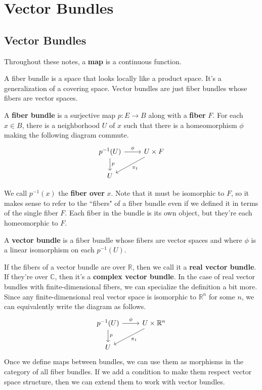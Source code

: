 \documentclass[twoside,10pt]{report}
\begin{document}
\tableofcontents



\chapter{Vector Bundles}


\section{Vector Bundles}

\begin{note}[]
Throughout these notes, a \textbf{map} is a continuous function.
\end{note}

A fiber bundle is a space that looks locally like a product space. It's a generalization of a covering space. Vector bundles are just fiber bundles whose fibers are vector spaces.

\begin{defn}[]
	A \textbf{fiber bundle} is a surjective map $p:E\to B$ along with a \textbf{fiber} $F$. For each $x \in B$, there is a neighborhood $U$ of $x$ such that there is a homeomorphism $\phi$ making the following diagram commute.
\[
\begin{tikzcd}
	p^{-1}(U) \rar{\phi}\dar{p} & U\times F\arrow[dl,"\pi_1"]\\
	U
\end{tikzcd}
\]
\end{defn}
We call $p^{-1}(x)$ the \textbf{fiber over} $x$. {\color{red}Note that it must be isomorphic to $F$}, so it makes sense to refer to the ``fibers" of a fiber bundle even if we defined it in terms of the single fiber $F$. Each fiber in the bundle is its own object, but they're each homeomorphic to $F$.

\begin{defn}
A \textbf{vector bundle} is a fiber bundle whose fibers are vector spaces and where $\phi$ is a linear isomorphism on each $p^{-1}(U)$.
\end{defn}

If the fibers of a vector bundle are over $\mathbb{R}$, then we call it a \textbf{real vector bundle}. If they're over $\mathbb{C}$, then it's a \textbf{complex vector bundle}. In the case of real vector bundles with finite-dimensional fibers, we can specialize the definition a bit more. Since any finite-dimensional real vector space is isomorphic to $\mathbb{R}^{n}$ for some $n$, we can equivalently write the diagram as follows.
\[
\begin{tikzcd}
        p^{-1}(U) \rar{\phi}\dar{p} & U\times \mathbb{R}^{n}\arrow[dl,"\pi_1"]\\
        U
\end{tikzcd}
\]
Once we define maps between bundles, we can use them as morphisms in the category of all fiber bundles. If we add a condition to make them respect vector space structure, then we can extend them to work with vector bundles.
\end{document}
